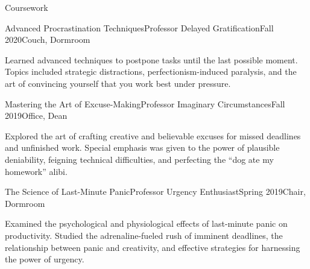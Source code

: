 \documentclass[]{kyvernitis-resume}
\begin{document}
\begin{section}{Coursework}
\begin{subsectionnobullet}{Advanced Procrastination Techniques}{Professor Delayed Gratification}{Fall 2020}{Couch, Dormroom}
    \item{Learned advanced techniques to postpone tasks until the last possible moment. Topics included strategic distractions, perfectionism-induced paralysis, and the art of convincing yourself that you work best under pressure.}
\end{subsectionnobullet}

\begin{subsectionnobullet}{Mastering the Art of Excuse-Making}{Professor Imaginary Circumstances}{Fall 2019}{Office, Dean}
    \item{Explored the art of crafting creative and believable excuses for missed deadlines and unfinished work. Special emphasis was given to the power of plausible deniability, feigning technical difficulties, and perfecting the ``dog ate my homework'' alibi.}
\end{subsectionnobullet}

\begin{subsectionnobullet}{The Science of Last-Minute Panic}{Professor Urgency Enthusiast}{Spring 2019}{Chair, Dormroom}
    \item{Examined the psychological and physiological effects of last-minute panic on productivity. Studied the adrenaline-fueled rush of imminent deadlines, the relationship between panic and creativity, and effective strategies for harnessing the power of urgency.}
\end{subsectionnobullet}

\end{section}



\end{document}
